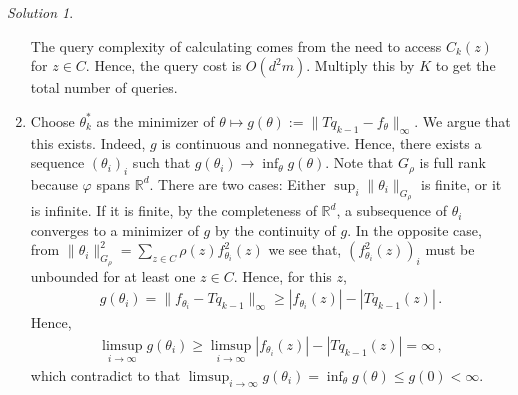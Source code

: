 \documentclass{article}
\newcommand{\norm}[1]{\| #1 \|}
\renewcommand{\phi}{\varphi}
\newcommand{\R}{\mathbb{R}}
\DeclareMathOperator*{\1}{\mathbbm{1}}
\newcommand{\0}{\mathbf{0}}
\theoremstyle{definition}
\theoremstyle{remark}
\newtheorem*{solution*}{Solution}
\newcommand{\cS}{\mathcal{S}}
\newcommand{\cA}{\mathcal{A}}
\begin{document}
\begin{solution*}
\begin{enumerate}
The query complexity of calculating comes from the need to access $C_k(z)$ for $z\in C$. Hence, the query cost is $O(d^2 m)$.
Multiply this by $K$ to get the total number of queries. 
\item Choose $\theta_k^*$ 
as the minimizer of $\theta \mapsto g(\theta):=\norm{ T q_{k-1} -  f_\theta }_\infty$. 
We argue that this exists. 
Indeed, $g$ is continuous and nonnegative. Hence, there exists a sequence $(\theta_i)_i$ such that $g(\theta_i)\to \inf_\theta g(\theta)$.
Note that $G_\rho$ is full rank because $\phi$ spans $\R^d$.
There are two cases: Either $\sup_i \norm{\theta_i}_{G_\rho}$ is finite, or it is infinite.
If it is finite, by the completeness of $\R^d$, a subsequence of $\theta_i$ converges to a minimizer of $g$
by the continuity of $g$.
In the opposite case, from $\norm{\theta_i}_{G_\rho}^2 = \sum_{z\in C} \rho(z) f_{\theta_i}^2(z)$ we see that, $(f_{\theta_i}^2(z))_i$ must be unbounded for at least one $z\in C$. 
Hence, for this $z$,
\begin{align*}
g(\theta_i)=\norm{f_{\theta_i} - T q_{k-1} }_\infty \ge |f_{\theta_i}(z)|-|T q_{k-1}(z)| \,.
\end{align*}
Hence,
\begin{align*}
\limsup_{i\to\infty} g(\theta_i) \ge \limsup_{i\to\infty} |f_{\theta_i}(z)|-|T q_{k-1}(z)|  = \infty\,,
\end{align*}
which contradict to that $\limsup_{i\to\infty} g(\theta_i) = \inf_{\theta} g(\theta) \le g(0) <\infty$.


\end{enumerate}
\end{solution*}
\end{document}

